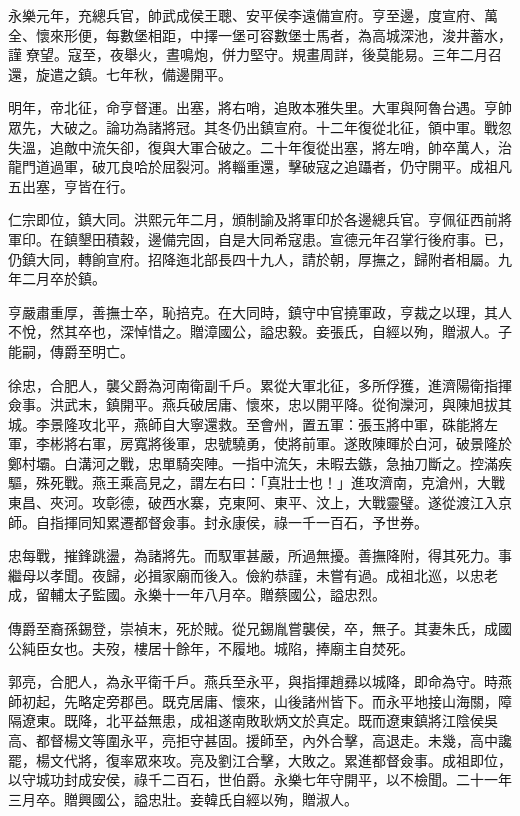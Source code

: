 \begin{pinyinscope}
永樂元年，充總兵官，帥武成侯王聰、安平侯李遠備宣府。亨至邊，度宣府、萬全、懷來形便，每數堡相距，中擇一堡可容數堡士馬者，為高城深池，浚井蓄水，謹尞望。寇至，夜舉火，晝鳴炮，併力堅守。規畫周詳，後莫能易。三年二月召還，旋遣之鎮。七年秋，備邊開平。

明年，帝北征，命亨督運。出塞，將右哨，追敗本雅失里。大軍與阿魯台遇。亨帥眾先，大破之。論功為諸將冠。其冬仍出鎮宣府。十二年復從北征，領中軍。戰忽失溫，追敵中流矢卻，復與大軍合破之。二十年復從出塞，將左哨，帥卒萬人，治龍門道過軍，破兀良哈於屈裂河。將輜重還，擊破寇之追躡者，仍守開平。成祖凡五出塞，亨皆在行。

仁宗即位，鎮大同。洪熙元年二月，頒制諭及將軍印於各邊總兵官。亨佩征西前將軍印。在鎮墾田積穀，邊備完固，自是大同希寇患。宣德元年召掌行後府事。已，仍鎮大同，轉餉宣府。招降迤北部長四十九人，請於朝，厚撫之，歸附者相屬。九年二月卒於鎮。

亨嚴肅重厚，善撫士卒，恥掊克。在大同時，鎮守中官撓軍政，亨裁之以理，其人不悅，然其卒也，深悼惜之。贈漳國公，謚忠毅。妾張氏，自經以殉，贈淑人。子能嗣，傳爵至明亡。

徐忠，合肥人，襲父爵為河南衛副千戶。累從大軍北征，多所俘獲，進濟陽衛指揮僉事。洪武末，鎮開平。燕兵破居庸、懷來，忠以開平降。從徇灤河，與陳旭拔其城。李景隆攻北平，燕師自大寧還救。至會州，置五軍：張玉將中軍，硃能將左軍，李彬將右軍，房寬將後軍，忠號驍勇，使將前軍。遂敗陳暉於白河，破景隆於鄭村壩。白溝河之戰，忠單騎突陣。一指中流矢，未暇去鏃，急抽刀斷之。控滿疾驅，殊死戰。燕王乘高見之，謂左右曰：「真壯士也！」進攻濟南，克滄州，大戰東昌、夾河。攻彰德，破西水寨，克東阿、東平、汶上，大戰靈璧。遂從渡江入京師。自指揮同知累遷都督僉事。封永康侯，祿一千一百石，予世券。

忠每戰，摧鋒跳盪，為諸將先。而馭軍甚嚴，所過無擾。善撫降附，得其死力。事繼母以孝聞。夜歸，必揖家廟而後入。儉約恭謹，未嘗有過。成祖北巡，以忠老成，留輔太子監國。永樂十一年八月卒。贈蔡國公，謚忠烈。

傳爵至裔孫錫登，崇禎末，死於賊。從兄錫胤嘗襲侯，卒，無子。其妻朱氏，成國公純臣女也。夫歿，樓居十餘年，不履地。城陷，捧廟主自焚死。

郭亮，合肥人，為永平衛千戶。燕兵至永平，與指揮趙彞以城降，即命為守。時燕師初起，先略定旁郡邑。既克居庸、懷來，山後諸州皆下。而永平地接山海關，障隔遼東。既降，北平益無患，成祖遂南敗耿炳文於真定。既而遼東鎮將江陰侯吳高、都督楊文等圍永平，亮拒守甚固。援師至，內外合擊，高退走。未幾，高中讒罷，楊文代將，復率眾來攻。亮及劉江合擊，大敗之。累進都督僉事。成祖即位，以守城功封成安侯，祿千二百石，世伯爵。永樂七年守開平，以不檢聞。二十一年三月卒。贈興國公，謚忠壯。妾韓氏自經以殉，贈淑人。


\end{pinyinscope}
